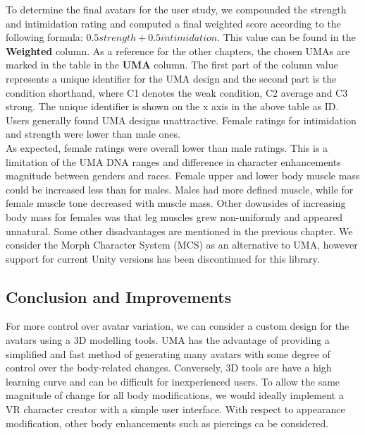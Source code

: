 To determine the final avatars for the user study, we compounded the strength and intimidation rating and computed a final weighted score according to the following formula: $ 0.5 strength + 0.5 intimidation $. This value can be found in the \textbf{Weighted} column. 
As a reference for the other chapters, the chosen UMAs are marked in the table in the \textbf{UMA} column. The first part of the column value represents a unique identifier for the UMA design and the second part is the condition shorthand, where C1 denotes the weak condition, C2 average and C3 strong. The unique identifier is shown on the x axis in the above table as ID.
Users generally found UMA designs unattractive. Female ratings for intimidation and strength were lower than male ones.
\\
As expected, female ratings were overall lower than male ratings. This is a limitation of the UMA DNA ranges and difference in character enhancements magnitude between  genders and races. Female upper and lower body muscle mass could be increased less than for males. Males had more defined muscle, while for female muscle tone decreased with muscle mass. Other downsides of increasing body mass for females was that leg muscles grew non-uniformly and appeared unnatural. Some other disadvantages are mentioned in the previous chapter. We consider the Morph Character System (MCS) as an alternative to UMA, however support for current Unity versions has been discontinued for this library.

\subsection{Conclusion and Improvements}
For more control over avatar variation, we can consider a custom design for the avatars using a 3D modelling tools.  UMA has the advantage of providing a simplified and fast method of generating many avatars with some degree of control over the body-related changes. Conversely, 3D tools are have a high learning curve and can be difficult for inexperienced users. To allow the same magnitude of change for all body modifications, we would ideally implement a VR character creator with a simple user interface. With respect to appearance modification, other body enhancements such as piercings ca be considered.
